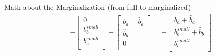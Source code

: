 \documentclass[10pt]{beamer}
\begin{document}
\begin{frame}{Math about the Marginalization (from full to marginalized)}
\begin{equation}
\begin{array}{rcl}
		& = & -\left[\begin{array}{c}
		0 \\
		b_b^{small} \\
		b_c^{small} \\
		\end{array}\right] - \left[\begin{array}{c}
		\bar{b}_a+\hat{b}_a \\
		\hat{b}_b \\
		0 \\
		\end{array}\right] = -\left[\begin{array}{c}
		\bar{b}_a + \hat{b}_a \\
		b_b^{small} + \hat{b}_b \\
		b_c^{small} \\
		\end{array}\right]\\ 
		\end{array}
		\end{equation}
	\end{frame}
\end{document}
